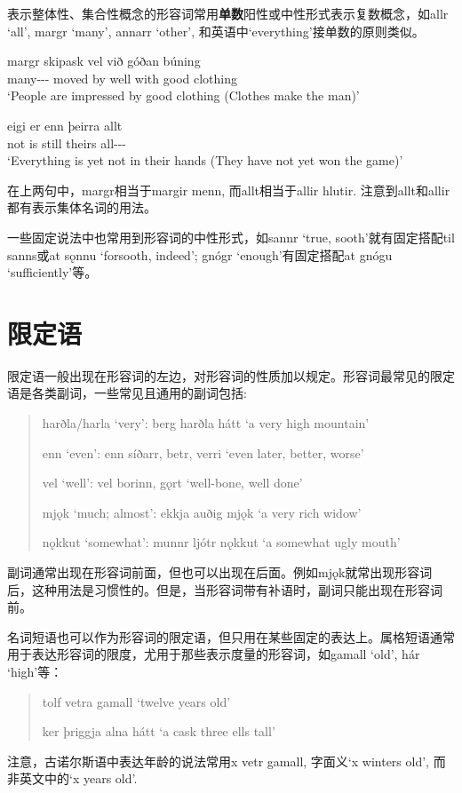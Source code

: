 表示整体性、集合性概念的形容词常用\textbf{单数}阳性或中性形式表示复数概念，如allr `all', margr `many', annarr `other', 和英语中`everything'接单数的原则类似。
\begin{exe}
    \ex \gll
    margr skipask vel við góðan búning\\
    many-{\nom}-{\mas}-{\sing} {moved by} well with good clothing\\
    \trans `People are impressed by good clothing (Clothes make the man)'

    \ex \gll
    eigi er enn þeirra allt\\
    not is still theirs all-{\nom}-{\neu}-{\sing}\\
    \trans `Everything is yet not in their hands (They have not yet won the game)'
\end{exe}

在上两句中，margr相当于margir menn, 而allt相当于allir hlutir. 注意到allt和allir都有表示集体名词的用法。

一些固定说法中也常用到形容词的中性形式，如sannr `true, sooth'就有固定搭配til sanns或at sǫnnu `forsooth, indeed'; gnógr `enough'有固定搭配at gnógu `sufficiently'等。

\section{限定语}
限定语一般出现在形容词的左边，对形容词的性质加以规定。形容词最常见的限定语是各类副词，一些常见且通用的副词包括:
\begin{quote}
    harðla/harla `very': berg harðla hátt `a very high mountain'

    enn `even': enn síðarr, betr, verri `even later, better, worse'

    vel `well': vel borinn, gǫrt `well-bone, well done'

    mjǫk `much; almost': ekkja auðig mjǫk `a very rich widow'

    nǫkkut `somewhat': munnr ljótr nǫkkut `a somewhat ugly mouth'
\end{quote}

副词通常出现在形容词前面，但也可以出现在后面。例如mjǫk就常出现形容词后，这种用法是习惯性的。但是，当形容词带有补语时，副词只能出现在形容词前。

名词短语也可以作为形容词的限定语，但只用在某些固定的表达上。属格短语通常用于表达形容词的限度，尤用于那些表示度量的形容词，如gamall `old', hár `high'等：
\begin{quote}
    tolf vetra gamall `twelve years old'

    ker þriggja alna hátt `a cask three ells tall'
\end{quote}

注意，古诺尔斯语中表达年龄的说法常用x vetr gamall, 字面义`x winters old', 而非英文中的`x years old'.